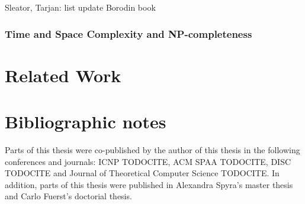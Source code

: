 Sleator, Tarjan: list update \cite{competitive-analysis}
Borodin book \cite{borodin-book}

\subsubsection{Time and Space Complexity and NP-completeness}


\section{Related Work}





\section{Bibliographic notes}

Parts of this thesis were co-published by the author of this thesis in the following conferences and journals: ICNP TODOCITE, ACM SPAA TODOCITE, DISC TODOCITE and Journal of Theoretical Computer Science TODOCITE.
In addition, parts of this thesis were published in Alexandra Spyra's master thesis and Carlo Fuerst's doctorial thesis.